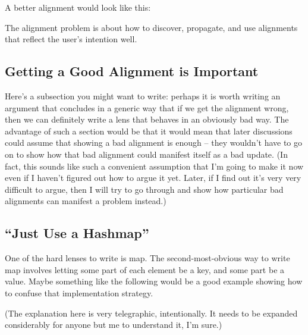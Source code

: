 \noindent A better alignment would look like this:


\noindent The alignment problem is about how to discover, propagate, and use
alignments that reflect the user's intention well.

\subsection{Getting a Good Alignment is Important}
Here's a subsection you might want to write: perhaps it is worth writing an
argument that concludes in a generic way that if we get the alignment wrong,
then we can definitely write a lens that behaves in an obviously bad way.
The advantage of such a section would be that it would mean that later
discussions could assume that showing a bad alignment is enough -- they
wouldn't have to go on to show how that bad alignment could manifest itself
as a bad update. (In fact, this sounds like such a convenient assumption
that I'm going to make it now even if I haven't figured out how to argue it
yet. Later, if I find out it's very very difficult to argue, then I will try
to go through and show how particular bad alignments can manifest a problem
instead.)

\subsection{``Just Use a Hashmap''}
One of the hard lenses to write is map.
The second-most-obvious way to write map involves letting some part of each
element be a key, and some part be a value.
Maybe something like the following would be a good example showing how to
confuse that implementation strategy.

(The explanation here is very telegraphic, intentionally. It needs to be
expanded considerably for anyone but me to understand it, I'm sure.)

